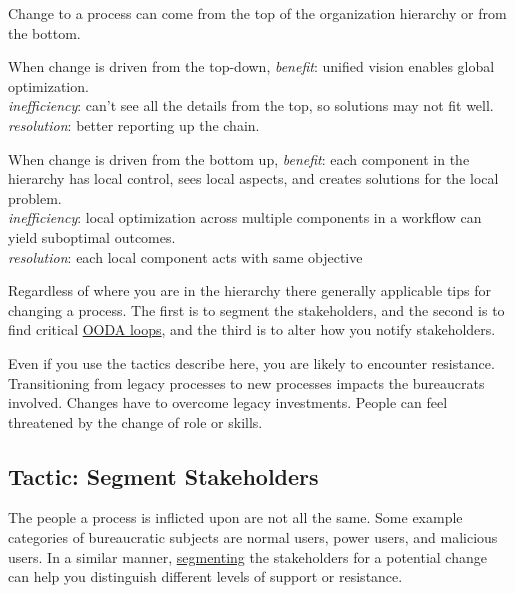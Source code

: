 Change to a process can come from the top of the organization hierarchy or from the bottom. 

When change is driven from the top-down,
\textit{benefit}: unified vision enables global optimization.\\
\textit{inefficiency}: can't see all the details from the top, so solutions may not fit well.\\
\textit{resolution}: better reporting up the chain.

When change is driven from the bottom up,
\textit{benefit}: each component in the hierarchy has local control, sees local aspects, and creates solutions for the local problem.\\
\textit{inefficiency}: local optimization across multiple components in a workflow can yield suboptimal outcomes.\\
\textit{resolution}: each local component acts with same objective

Regardless of where you are in the hierarchy there generally applicable tips for changing a process. The first is to segment the stakeholders, and the second is to find critical \href{https://en.wikipedia.org/wiki/OODA_loop}{OODA loops},
 and the third is to alter how you notify stakeholders.

Even if you use the tactics describe here, you are likely to encounter resistance. 
Transitioning from legacy processes to new processes impacts the bureaucrats involved. Changes have to overcome legacy investments. People can feel threatened by the change of role or skills.  

\subsection*{Tactic: Segment Stakeholders}

The people a process is inflicted upon are not all the same. Some example categories of bureaucratic subjects are
normal users, power users, and malicious users.
In a similar manner, 
\href{https://en.wikipedia.org/wiki/Market_segmentation}{segmenting}
the stakeholders for a potential change can help you distinguish different levels of support or resistance. 


